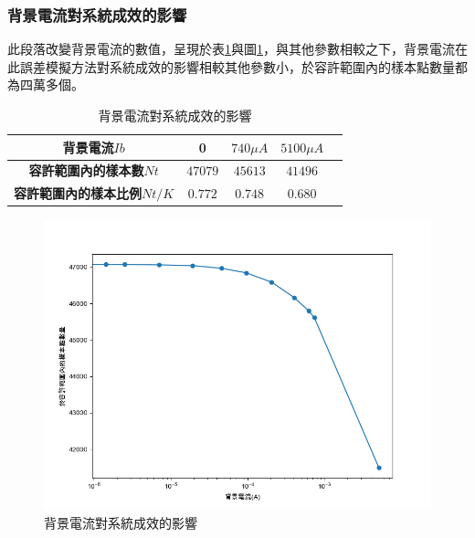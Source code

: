     \subsubsection{背景電流對系統成效的影響}
    \label{chp:backgroung_bandwidth}

    此段落改變背景電流的數值，呈現於表\ref{tab:background_effect}與圖\ref{pic:background_effect}，與其他參數相較之下，背景電流在此誤差模擬方法對系統成效的影響相較其他參數小，於容許範圍內的樣本點數量都為四萬多個。

    \begin{table}[htpb]
        \begin{center}
          \caption{背景電流對系統成效的影響}
          \label{tab:background_effect}
          \begin{tabular}{|c||c|c|c|c|} %
            \hline  
           \textbf{背景電流$Ib$} &
           0&
           $740\mu A$&
           $5100\mu A$
           \\\hline\hline

           \textbf{容許範圍內的樣本數$Nt$} &
           $47079$&
           $45613$&
           $41496$
           \\\hline

           \textbf{容許範圍內的樣本比例$Nt/K$} &
           $0.772$&
           $0.748$&
           $0.680$
           \\\hline
         \end{tabular}
       \end{center}
     \end{table}

     \begin{figure}[htpb]
        \centering
        \includegraphics[width=15cm]{ch4pic/background_effect.png}
        \caption{背景電流對系統成效的影響}
        \label{pic:background_effect}
    \end{figure}

